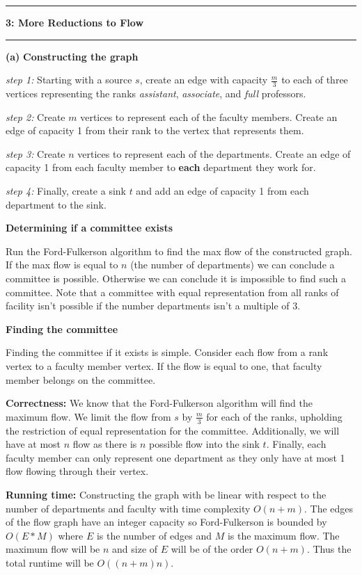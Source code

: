 \documentclass[11pt]{article}
\newcommand\question[2]{\vspace{.25in}\hrule\textbf{#1: #2}\vspace{.5em}\hrule\vspace{.10in}}
\renewcommand\part[1]{\vspace{.10in}\textbf{(#1)}}
\newcommand\correctness{\vspace{.10in}\textbf{Correctness: }}
\newcommand\runtime{\vspace{.10in}\textbf{Running time: }}
\begin{document}
\question{3}{More Reductions to Flow}

\part{a} \textbf{Constructing the graph} 

\textit{step 1:} Starting with a source $s$, create an edge with capacity $\frac{m}{3}$ to each of three vertices representing the ranks \textit{assistant}, \textit{associate}, and \textit{full} professors. 

\textit{step 2:} Create $m$ vertices to represent each of the faculty members. Create an edge of capacity 1 from their rank to the vertex that represents them.

\textit{step 3:} Create $n$ vertices to represent each of the departments. Create an edge of capacity 1 from each faculty member to \textbf{each} department they work for.

\textit{step 4:} Finally, create a sink $t$ and add an edge of capacity 1 from each department to the sink.

\textbf{Determining if a committee exists}

 Run the Ford-Fulkerson algorithm to find the max flow of the constructed graph. If the max flow is equal to $n$ (the number of departments) we can conclude a committee is possible. Otherwise we can conclude it is impossible to find such a committee. Note that a committee with equal representation from all ranks of facility isn't possible if the number departments isn't a multiple of 3.

\textbf{Finding the committee} 

Finding the committee if it exists is simple. Consider each flow from a rank vertex to a faculty member vertex. If the flow is equal to one, that faculty member belongs on the committee.

\correctness We know that the Ford-Fulkerson algorithm will find the maximum flow. We limit the flow from $s$ by $\frac{m}{3}$ for each of the ranks, upholding the restriction of equal representation for the committee. Additionally, we will have at most $n$ flow as there is $n$ possible flow into the sink $t$. Finally, each faculty member can only represent one department as they only have at most 1 flow flowing through their vertex.

\runtime Constructing the graph with be linear with respect to the number of departments and faculty with time complexity $O(n + m)$. The edges of the flow graph have an integer capacity so Ford-Fulkerson is bounded by $O(E * M)$ where $E$ is the number of edges and $M$ is the maximum flow. The maximum flow will be $n$ and size of $E$ will be of the order $O(n + m)$. Thus the total runtime will be $O((n + m)n)$.
\end{document}
